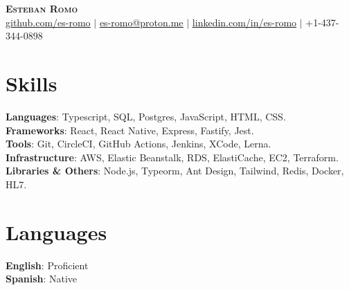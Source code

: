 \documentclass[letterpaper,11pt]{article}
\begin{document}
\begin{center}
    \textbf{\Huge \scshape Esteban Romo} \\ \vspace{1pt}
    \href{https://github.com/es-romo}{\underline{github.com/es-romo}} $|$ 
    \href{mailto:es-romo@proton.me}{\underline{es-romo@proton.me}} $|$ 
    \href{https://www.linkedin.com/in/es-romo/}{\underline{linkedin.com/in/es-romo}} $|$ 
    \small +1-437-344-0898
\end{center}

\begin{minipage}[t]{.78\textwidth}
  \section{Skills}
  \begin{itemize}[leftmargin=0.15in, label={}]
      \small{\item{
      \textbf{Languages}{: Typescript, SQL, Postgres, JavaScript, HTML, CSS.} \\
      \textbf{Frameworks}{: React, React Native, Express, Fastify, Jest.} \\
      \textbf{Tools}{: Git, CircleCI, GitHub Actions, Jenkins, XCode, Lerna.} \\
      \textbf{Infrastructure}{: AWS, Elastic Beanstalk, RDS, ElastiCache, EC2, Terraform.} \\
      \textbf{Libraries \& Others}{: Node.js, Typeorm, Ant Design, Tailwind, Redis, Docker, HL7.} \\
      }}
  \end{itemize}
\end{minipage}\hspace{.02\textwidth}%
\begin{minipage}[t]{.20\textwidth}
  \section{Languages}
  \begin{itemize}[leftmargin=0.0in, label={}]
      \small{\item{
      \textbf{English}{: Proficient} \\
      \textbf{Spanish}{: Native} \\
      }}
  \end{itemize}
\end{minipage}\vspace{-10pt}
\end{document}
